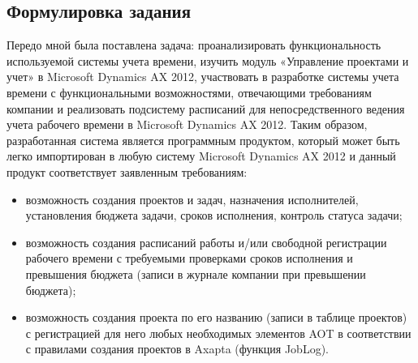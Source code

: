\subsection{Формулировка задания}
Передо мной была поставлена задача: проанализировать функциональность используемой системы учета времени, изучить модуль «Управление проектами и учет» в Microsoft Dynamics AX 2012, участвовать в разработке системы учета времени с функциональными возможностями, отвечающими требованиям компании и реализовать подсистему расписаний для непосредственного ведения учета рабочего времени в Microsoft Dynamics AX 2012. Таким образом, разработанная система является программным продуктом, который может быть легко импортирован в любую систему Microsoft Dynamics AX 2012 и данный продукт соответствует заявленным требованиям:
\begin{itemize}
  \item возможность создания проектов и задач, назначения исполнителей, установления бюджета задачи, сроков исполнения, контроль статуса задачи;
  \item возможность создания расписаний работы и/или свободной регистрации рабочего времени с  требуемыми проверками сроков исполнения и превышения бюджета (записи в журнале компании при превышении бюджета);
  \item возможность создания проекта по его названию (записи в таблице проектов) с регистрацией для него любых необходимых элементов AOT в соответствии с правилами создания проектов в Axapta (функция JobLog).
\end{itemize}